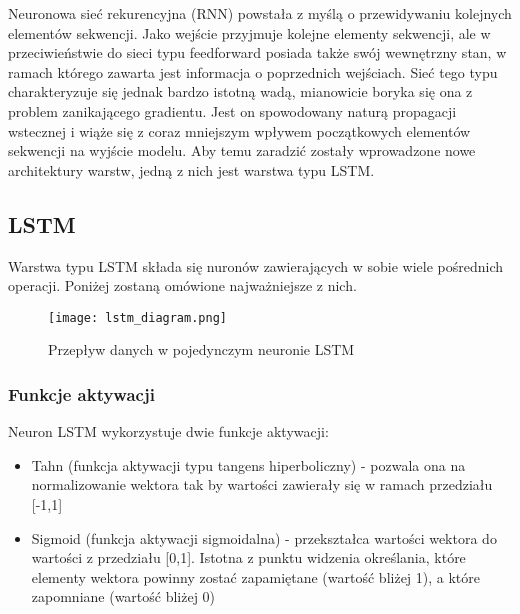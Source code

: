 

Neuronowa sieć rekurencyjna (RNN) powstała z myślą o przewidywaniu kolejnych elementów sekwencji. Jako wejście przyjmuje kolejne elementy sekwencji, ale w przeciwieństwie do sieci typu feedforward posiada także swój wewnętrzny  stan, w ramach którego zawarta jest informacja o poprzednich wejściach. Sieć tego typu charakteryzuje się jednak bardzo istotną wadą, mianowicie boryka się ona z problem zanikającego gradientu. Jest on spowodowany naturą propagacji wstecznej i wiąże się z coraz mniejszym wpływem początkowych elementów sekwencji na wyjście modelu. Aby temu zaradzić zostały wprowadzone nowe architektury warstw, jedną z nich jest warstwa typu LSTM. \cite{RNN_1} \cite{RNN_2}




\subsection{\label{lstm_subsection}LSTM}




Warstwa typu LSTM składa się nuronów zawierających w sobie wiele pośrednich operacji. Poniżej zostaną omówione najważniejsze z nich\cite{LSTM_1}.

\begin{figure}[!h]
    \label{fig:lstm_diagram}
    \centering \texttt{[image: lstm\_diagram.png]}
    \caption{Przepływ danych w pojedynczym neuronie LSTM}
\end{figure}




\subsubsection{Funkcje aktywacji}

Neuron LSTM wykorzystuje dwie funkcje aktywacji:

\begin{itemize}
    \item Tahn (funkcja aktywacji typu tangens hiperboliczny) - pozwala ona na normalizowanie wektora tak by wartości zawierały się w ramach przedziału [-1,1]
    \item Sigmoid (funkcja aktywacji sigmoidalna) - przekształca wartości wektora do wartości z przedziału [0,1]. Istotna z punktu widzenia określania, które elementy wektora powinny zostać zapamiętane (wartość bliżej 1), a które zapomniane (wartość bliżej 0)
\end{itemize}


